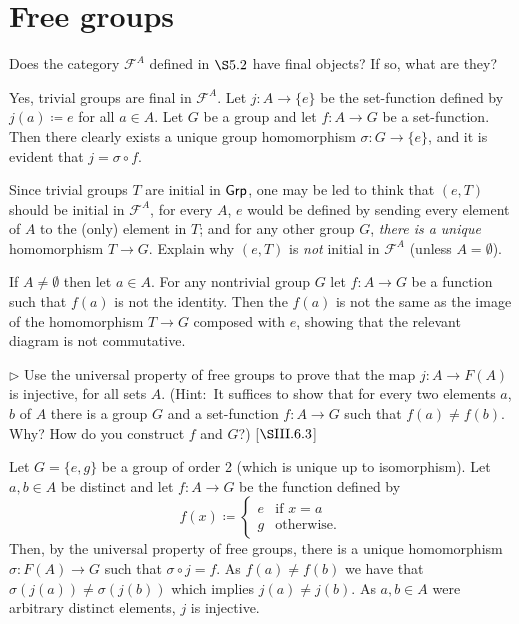 \section{Free groups}
\extitle
\begin{exercise}
	Does the category $\mathscr{F}^A$ defined in $\S 5.2$ have final objects? If so, what are they?
\end{exercise}
\begin{solution}
	Yes, trivial groups are final in  $\mathscr{F}^A$. Let $j\colon A \to \{e\}$ be the set-function defined by $j(a) \coloneqq e$ for all $a\in A$. Let $G$ be a group and let $f\colon A \to G$ be a set-function. Then there clearly exists a unique group homomorphism $\sigma \colon G \to \{e\}$, and it is evident that $j = \sigma \circ f$.
\end{solution}

\begin{exercise}
	Since trivial groups $T$ are initial in $\textsf{Grp}$, one may be led to think that $(e,T)$ should be initial in $\mathscr{F}^A$, for every $A$, $e$ would be defined by sending every element of $A$ to the (only) element in $T$; and for any other group $G$, \emph{there is a unique} homomorphism $T \to G$. Explain why $(e,T)$ is \emph{not} initial in $\mathscr{F}^A$ (unless $A =\emptyset$).
\end{exercise}
\begin{solution}
	If $A \neq \emptyset$ then let $a\in A$. For any nontrivial group $G$ let $f\colon A \to G$ be a function such that $f(a)$ is not the identity. Then the $f(a)$ is not the same as the image of the homomorphism $T\to G$ composed with $e$, showing that the relevant diagram is not commutative. 
\end{solution}

\begin{exercise}
	$\triangleright$ Use the universal property of free groups to prove that the map $j\colon A \to F(A)$ is injective, for all sets $A$. (Hint$\colon$ It suffices to show that for every two elements $a$, $b$ of $A$ there is a group $G$ and a set-function $f\colon A \to G$ such that $f(a) \neq f(b)$. Why? How do you construct $f$ and $G$?) [$\S\RNo{3}.6.3$]
\end{exercise}
\begin{solution}
	Let $G = \{e,g\}$ be a group of order 2 (which is unique up to isomorphism). Let $a,b \in A$ be distinct and let $f\colon A \to G$ be the function defined by
	\[
		f(x) \coloneqq 
		\begin{cases}
			e & \text{if }x = a\\
			g & \text{otherwise}.
		\end{cases}
	\]
	Then, by the universal property of free groups, there is a unique homomorphism $\sigma \colon F(A) \to G$ such that $\sigma \circ j = f$. As $f(a)\neq f(b)$ we have that $\sigma(j(a)) \neq \sigma(j(b))$ which implies $j(a)\neq j(b)$. As $a,b \in A$ were arbitrary distinct elements, $j$ is injective.
\end{solution}

